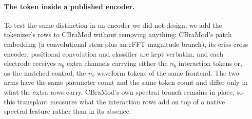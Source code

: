 \paragraph{The token inside a published encoder.}
To test the same distinction in an encoder we did not design, we add the
tokenizer's rows to CBraMod \citep{wang2025cbramod} without removing
anything: CBraMod's patch embedding (a convolutional stem plus an rFFT
magnitude branch), its criss-cross encoder, positional convolution and
classifier are kept verbatim, and each electrode receives $n_b$ extra
channels carrying either the $n_b$ interaction tokens or, as the matched
control, the $n_b$ waveform tokens of the same frontend. The two arms have
the same parameter count and the same token count and differ only in what
the extra rows carry. CBraMod's own spectral branch remains in place, so this transplant
measures what the interaction rows add on top of a native spectral
feature rather than in its absence.

